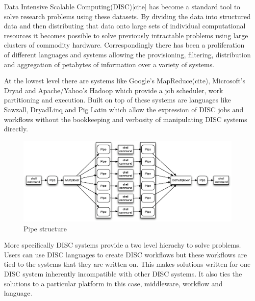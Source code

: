 \documentclass[11pt, letterpaper]{article}
\begin{document}
Data Intensive Scalable Computing(DISC)[cite] has become a standard tool to solve research problems using these datasets. By dividing the data into structured data and then distributing that data onto large sets of individual computational resources it becomes possible to solve previously intractable problems using large clusters of commodity hardware. Correspondingly there has been a proliferation of different languages and systems allowing the provisioning, filtering, distribution and aggregation of petabytes of information over a variety of systems.  

At the lowest level there are systems like Google's MapReduce(cite), Microsoft's Dryad and Apache/Yahoo's Hadoop which provide a job scheduler, work partitioning and execution. Built on top of these systems are languages like Sawzall, DryadLinq and Pig Latin which allow the expression of DISC jobs and workflows without the bookkeeping and verbosity of manipulating DISC systems directly.    
\begin{figure}[htp]
\centering
\includegraphics[width=4.5in]{pipestruct.eps}
\caption{Pipe structure}\label{fig:pipestruct} 
\end{figure}
More specifically DISC systems provide a two level hierachy to solve problems. Users can use DISC languages to create DISC workflows but these workflows are tied to the systems that they are written on. This makes solutions written for one DISC system inherently incompatible with other DISC systems. It also ties the solutions to a particular platform in this case, middleware, workflow and language.   
\end{document}
